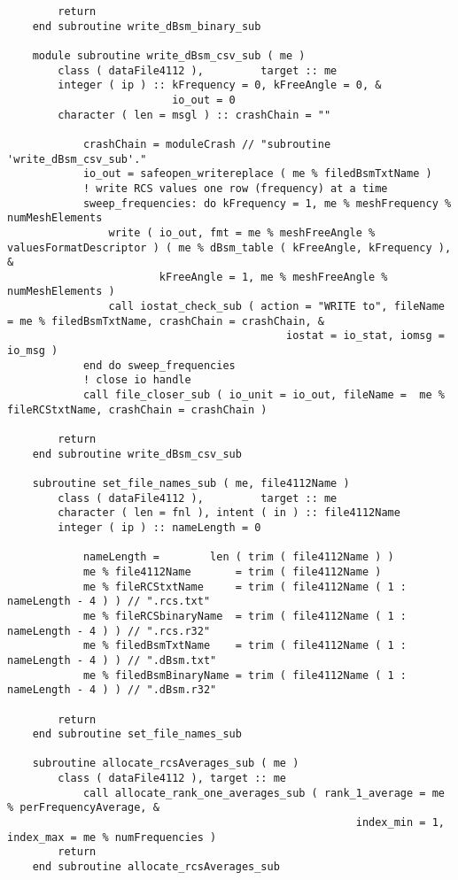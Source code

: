 {{\begin{lstlisting}
        return
    end subroutine write_dBsm_binary_sub

    module subroutine write_dBsm_csv_sub ( me )
        class ( dataFile4112 ),         target :: me
        integer ( ip ) :: kFrequency = 0, kFreeAngle = 0, &
                          io_out = 0
        character ( len = msgl ) :: crashChain = ""

            crashChain = moduleCrash // "subroutine 'write_dBsm_csv_sub'."
            io_out = safeopen_writereplace ( me % filedBsmTxtName )
            ! write RCS values one row (frequency) at a time
            sweep_frequencies: do kFrequency = 1, me % meshFrequency % numMeshElements
                write ( io_out, fmt = me % meshFreeAngle % valuesFormatDescriptor ) ( me % dBsm_table ( kFreeAngle, kFrequency ), &
                        kFreeAngle = 1, me % meshFreeAngle % numMeshElements )
                call iostat_check_sub ( action = "WRITE to", fileName = me % filedBsmTxtName, crashChain = crashChain, &
                                            iostat = io_stat, iomsg = io_msg )
            end do sweep_frequencies
            ! close io handle
            call file_closer_sub ( io_unit = io_out, fileName =  me % fileRCStxtName, crashChain = crashChain )

        return
    end subroutine write_dBsm_csv_sub

    subroutine set_file_names_sub ( me, file4112Name )
        class ( dataFile4112 ),         target :: me
        character ( len = fnl ), intent ( in ) :: file4112Name
        integer ( ip ) :: nameLength = 0

            nameLength =        len ( trim ( file4112Name ) )
            me % file4112Name       = trim ( file4112Name )
            me % fileRCStxtName     = trim ( file4112Name ( 1 : nameLength - 4 ) ) // ".rcs.txt"
            me % fileRCSbinaryName  = trim ( file4112Name ( 1 : nameLength - 4 ) ) // ".rcs.r32"
            me % filedBsmTxtName    = trim ( file4112Name ( 1 : nameLength - 4 ) ) // ".dBsm.txt"
            me % filedBsmBinaryName = trim ( file4112Name ( 1 : nameLength - 4 ) ) // ".dBsm.r32"

        return
    end subroutine set_file_names_sub

    subroutine allocate_rcsAverages_sub ( me )
        class ( dataFile4112 ), target :: me
            call allocate_rank_one_averages_sub ( rank_1_average = me % perFrequencyAverage, &
                                                       index_min = 1, index_max = me % numFrequencies )
        return
    end subroutine allocate_rcsAverages_sub


\end{lstlisting}}}
